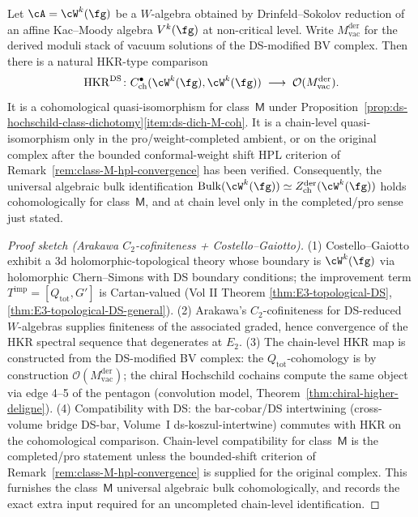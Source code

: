 \begin{theorem}%
\label{thm:ds-hochschild-bridge}%
%
%
%
Let $\cA=\cW^k(\fg)$ be a $W$-algebra obtained by Drinfeld--Sokolov
reduction of an affine Kac--Moody algebra $V^k(\fg)$ at non-critical
level. Write $M_{\mathrm{vac}}^{\mathrm{der}}$ for the derived moduli
stack of vacuum solutions of the DS-modified BV complex.
Then there is a natural HKR-type comparison
\[
\mathrm{HKR}^{\mathrm{DS}}\colon
C^\bullet_{\mathrm{ch}}(\cW^k(\fg),\cW^k(\fg))
\;\longrightarrow\;
\mathcal{O}(M_{\mathrm{vac}}^{\mathrm{der}}).
\]
It is a cohomological quasi-isomorphism for class~$\mathsf M$ under
Proposition~\ref{prop:ds-hochschild-class-dichotomy}\ref{item:ds-dich-M-coh}.
It is a chain-level quasi-isomorphism only in the pro/weight-completed
ambient, or on the original complex after the bounded conformal-weight
shift HPL criterion of
Remark~\ref{rem:class-M-hpl-convergence} has been verified.
Consequently, the universal algebraic bulk identification
$\mathrm{Bulk}(\cW^k(\fg))\simeq Z^{\mathrm{der}}_{\mathrm{ch}}(\cW^k(\fg))$
holds cohomologically for class~$\mathsf M$, and at chain level only
in the completed/pro sense just stated.
\end{theorem}

\begin{proof}[Proof sketch (Arakawa $C_2$-cofiniteness + Costello--Gaiotto)]
(1) Costello--Gaiotto exhibit a 3d holomorphic-topological theory
whose boundary is $\cW^k(\fg)$ via holomorphic Chern--Simons with
DS boundary conditions; the improvement term
$T^{\mathrm{imp}}=[Q_{\mathrm{tot}},G']$ is Cartan-valued
(Vol II Theorem \ref{thm:E3-topological-DS}, \ref{thm:E3-topological-DS-general}).
(2) Arakawa's $C_2$-cofiniteness for DS-reduced $W$-algebras supplies
finiteness of the associated graded, hence convergence of the HKR
spectral sequence that degenerates at $E_2$.
(3) The chain-level HKR map is constructed from the DS-modified
BV complex: the $Q_{\mathrm{tot}}$-cohomology is by construction
$\mathcal{O}(M_{\mathrm{vac}}^{\mathrm{der}})$; the chiral Hochschild
cochains compute the same object via edge 4--5 of the pentagon
(convolution model, Theorem~\ref{thm:chiral-higher-deligne}).
(4) Compatibility with DS: the bar-cobar/DS intertwining
(cross-volume bridge DS-bar, Volume~I ds-koszul-intertwine)
commutes with HKR on the cohomological comparison. Chain-level
compatibility for class~$\mathsf M$ is the completed/pro statement
unless the bounded-shift criterion of
Remark~\ref{rem:class-M-hpl-convergence} is supplied for the original
complex. This furnishes the class~$\mathsf M$ universal algebraic bulk
cohomologically, and records the exact extra input required for an
uncompleted chain-level identification.
\end{proof}


